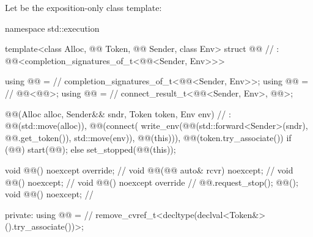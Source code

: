 \pnum
Let  be the exposition-only class template:

%
\begin{codeblock}
namespace std::execution {
  template<class Alloc, @@ Token, @@ Sender, class Env>
  struct @@                                                 // \expos
    : @@<completion_signatures_of_t<@@<Sender, Env>>> {
    using @@ =                                                          // \expos
      completion_signatures_of_t<@@<Sender, Env>>;
    using @@ =                                                      // \expos
      @@<@@>;
    using @@ =                                                            // \expos
      connect_result_t<@@<Sender, Env>, @@>;

    @@(Alloc alloc, Sender&& sndr, Token token, Env env)    // \expos
      : @@(std::move(alloc)),
        @@(connect(
          write_env(@@(std::forward<Sender>(sndr), @@.get_token()), std::move(env)),
          @@(this))),
        @@(token.try_associate()) {
          if (@@)
            start(@@);
          else
            set_stopped(@@(this));
        }

    void @@() noexcept override;                                      // \expos
    void @@(@@ auto& rcvr) noexcept;                             // \expos
    void @@() noexcept;                                                // \expos
    void @@() noexcept override {                                   // \expos
      @@.request_stop();
      @@();
    }
    void @@() noexcept;                                        // \expos

  private:
    using @@ =                                                         // \expos
      remove_cvref_t<decltype(declval<Token&>().try_associate())>;

}}
\end{codeblock}

